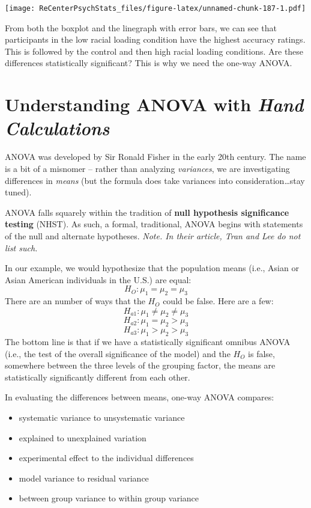 \documentclass[
  11pt,
]{book}
\providecommand{\tightlist}{%
  \setlength{\itemsep}{0pt}\setlength{\parskip}{0pt}}
\begin{document}
\texttt{[image: ReCenterPsychStats\_files/figure-latex/unnamed-chunk-187-1.pdf]}

From both the boxplot and the linegraph with error bars, we can see that participants in the low racial loading condition have the highest accuracy ratings. This is followed by the control and then high racial loading conditions. Are these differences statistically significant? This is why we need the one-way ANOVA.

\hypertarget{understanding-anova-with-hand-calculations}{%
\section{\texorpdfstring{Understanding ANOVA with \emph{Hand Calculations}}{Understanding ANOVA with Hand Calculations}}\label{understanding-anova-with-hand-calculations}}

ANOVA was developed by Sir Ronald Fisher in the early 20th century. The name is a bit of a misnomer -- rather than analyzing \emph{variances}, we are investigating differences in \emph{means} (but the formula does take variances into consideration\ldots stay tuned).

ANOVA falls squarely within the tradition of \textbf{null hypothesis significance testing} (NHST). As such, a formal, traditional, ANOVA begins with statements of the null and alternate hypotheses. \emph{Note. In their article, Tran and Lee \citeyearpar{tran_you_2014} do not list such.}

In our example, we would hypothesize that the population means (i.e., Asian or Asian American individuals in the U.S.) are equal:
\[H_{O}: \mu _{1} = \mu _{2} = \mu _{3}\]
There are an number of ways that the \(H_{O}\) could be false. Here are a few:
\[H_{a1}: \mu _{1} \neq \mu _{2} \neq \mu _{3}\]
\[H_{a2}: \mu _{1} = \mu _{2} > \mu _{3}\]
\[H_{a3}: \mu _{1} > \mu _{2} > \mu _{3}\]
The bottom line is that if we have a statistically significant omnibus ANOVA (i.e., the test of the overall significance of the model) and the \(H_{O}\) is false, somewhere between the three levels of the grouping factor, the means are statistically significantly different from each other.

In evaluating the differences between means, one-way ANOVA compares:

\begin{itemize}
\tightlist
\item
  systematic variance to unsystematic variance
\item
  explained to unexplained variation
\item
  experimental effect to the individual differences
\item
  model variance to residual variance
\item
  between group variance to within group variance
\end{itemize}
\end{document}
